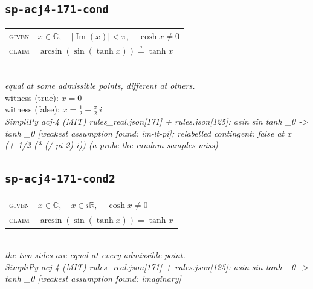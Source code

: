 \documentclass[11pt]{article}
\begin{document}
\subsection*{\texttt{sp-acj4-171-cond}}
\begin{tabular}{@{}l@{\quad}l@{}}
\textsc{given} & $x \in \mathbb{C},\quad \left|\operatorname{Im}\left(x\right)\right| < \pi,\quad \cosh x \neq 0$ \\[4pt]
\textsc{claim} & $\displaystyle \arcsin\left(\sin\left(\tanh x\right)\right) \overset{?}{=} \tanh x$ \\
\end{tabular}\\[2pt]
{\small\emph{equal at some admissible points, different at others.}}\\
{\footnotesize\color{gray}witness (true): $x = 0$}\\
{\footnotesize\color{gray}witness (false): $x = \frac{1}{2} + \frac{\pi}{2} \, i$}\\
\emph{SimpliPy acj-4 (MIT) rules\_real.json[171] + rules.json[125]: asin sin tanh \_0  ->  tanh \_0  [weakest assumption found: im-lt-pi]; relabelled contingent: false at x = (+ 1/2 (* (/ pi 2) i)) (a probe the random samples miss)}\\

\subsection*{\texttt{sp-acj4-171-cond2}}
\begin{tabular}{@{}l@{\quad}l@{}}
\textsc{given} & $x \in \mathbb{C},\quad x \in i\mathbb{R},\quad \cosh x \neq 0$ \\[4pt]
\textsc{claim} & $\displaystyle \arcsin\left(\sin\left(\tanh x\right)\right) = \tanh x$ \\
\end{tabular}\\[2pt]
{\small\emph{the two sides are equal at every admissible point.}}\\
\emph{SimpliPy acj-4 (MIT) rules\_real.json[171] + rules.json[125]: asin sin tanh \_0  ->  tanh \_0  [weakest assumption found: imaginary]}\\
\end{document}
